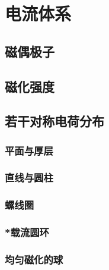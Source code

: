 

\section{电流体系}\label{18-4}

\subsection{磁偶极子}\label{18-4-1}

\subsection{磁化强度}\label{18-4-2}

\subsection{若干对称电荷分布}\label{18-4-3}

\subsubsection{平面与厚层}\label{18-4-3-1}

\subsubsection{直线与圆柱}\label{18-4-3-2}

\subsubsection{螺线圈}\label{18-4-3-3}

\subsubsection{*载流圆环}\label{18-4-3-4}

\subsubsection{均匀磁化的球}\label{18-4-3-5}

